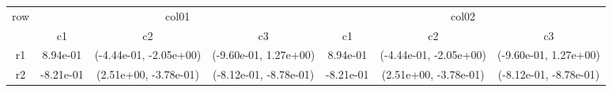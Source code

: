 \begin{tabular}{ccccccc}
\toprule
\multirow{2}{*}{row}&\multicolumn{3}{c}{col01}&\multicolumn{3}{c}{col02}\tabularnewline
\cmidrule(lr){2-4}
\cmidrule(lr){5-7}
&c1&c2&c3&c1&c2&c3\tabularnewline
\midrule
r1&8.94e-01& (-4.44e-01, -2.05e+00)& (-9.60e-01, 1.27e+00)&8.94e-01& (-4.44e-01, -2.05e+00)& (-9.60e-01, 1.27e+00)\tabularnewline
r2&-8.21e-01& (2.51e+00, -3.78e-01)& (-8.12e-01, -8.78e-01)&-8.21e-01& (2.51e+00, -3.78e-01)& (-8.12e-01, -8.78e-01)\tabularnewline
\bottomrule
\end{tabular}
